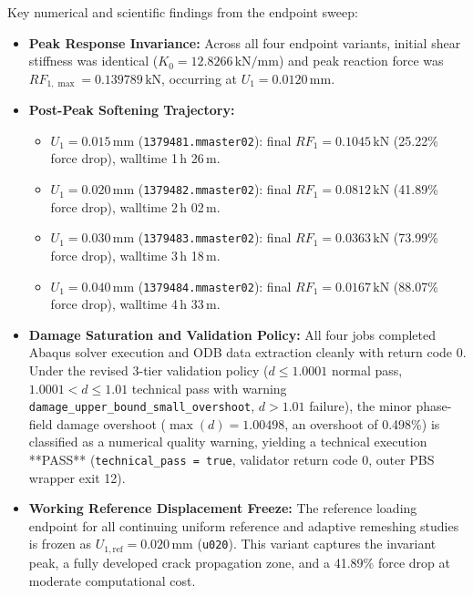 Key numerical and scientific findings from the endpoint sweep:
\begin{itemize}
    \item \textbf{Peak Response Invariance:} Across all four endpoint variants, initial shear stiffness was identical ($K_0 = 12.8266\,\text{kN/mm}$) and peak reaction force was $RF_{1,\max} = 0.139789\,\text{kN}$, occurring at $U_1 = 0.0120\,\text{mm}$.
    \item \textbf{Post-Peak Softening Trajectory:}
    \begin{itemize}
        \item $U_1 = 0.015\,\text{mm}$ (\texttt{1379481.mmaster02}): final $RF_1 = 0.1045\,\text{kN}$ (25.22\% force drop), walltime 1\,h 26\,m.
        \item $U_1 = 0.020\,\text{mm}$ (\texttt{1379482.mmaster02}): final $RF_1 = 0.0812\,\text{kN}$ (41.89\% force drop), walltime 2\,h 02\,m.
        \item $U_1 = 0.030\,\text{mm}$ (\texttt{1379483.mmaster02}): final $RF_1 = 0.0363\,\text{kN}$ (73.99\% force drop), walltime 3\,h 18\,m.
        \item $U_1 = 0.040\,\text{mm}$ (\texttt{1379484.mmaster02}): final $RF_1 = 0.0167\,\text{kN}$ (88.07\% force drop), walltime 4\,h 33\,m.
    \end{itemize}
    \item \textbf{Damage Saturation and Validation Policy:} All four jobs completed Abaqus solver execution and ODB data extraction cleanly with return code 0. Under the revised 3-tier validation policy ($d \le 1.0001$ normal pass, $1.0001 < d \le 1.01$ technical pass with warning \texttt{damage\_upper\_bound\_small\_overshoot}, $d > 1.01$ failure), the minor phase-field damage overshoot ($\max(d) = 1.00498$, an overshoot of 0.498\%) is classified as a numerical quality warning, yielding a technical execution **PASS** (\texttt{technical\_pass = true}, validator return code 0, outer PBS wrapper exit 12).
    \item \textbf{Working Reference Displacement Freeze:} The reference loading endpoint for all continuing uniform reference and adaptive remeshing studies is frozen as $U_{1,\mathrm{ref}} = 0.020\,\text{mm}$ (\texttt{u020}). This variant captures the invariant peak, a fully developed crack propagation zone, and a 41.89\% force drop at moderate computational cost.
\end{itemize}

